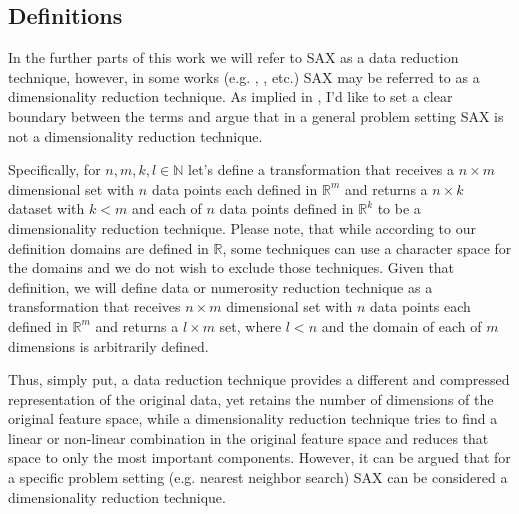 \documentclass{article}
\begin{document}
\subsection{Definitions}
In the further parts of this work we will refer to SAX as a data reduction technique, however, in some works (e.g. \cite{keogh2001dimensionality}, \cite{lin2007experiencing}, \cite{shieh2008sax} etc.) SAX may be referred to as a dimensionality reduction technique. As implied in \cite{xi2006fast}, I'd like to set a clear boundary between the terms and argue that in a general problem setting SAX is not a dimensionality reduction technique. \par
Specifically, for $n,m,k,l \in \mathbb{N}$ let's define a transformation that receives a $n \times m$ dimensional set with $n$ data points each defined in $\mathbb{R}^m$ and returns a $n \times k$ dataset with $k < m$ and each of $n$ data points defined in $\mathbb{R}^k$ to be a dimensionality reduction technique. Please note, that while according to our definition domains are defined in $\mathbb{R}$, some techniques can use a character space for the domains and we do not wish to exclude those techniques. Given that definition, we will define data or numerosity reduction technique as a transformation that receives $n \times m$ dimensional set with $n$ data points each defined in $\mathbb{R}^m$ and returns a $l \times m$ set, where $l < n$ and the domain of each of $m$ dimensions is arbitrarily defined. \par
Thus, simply put, a data reduction technique provides a different and compressed representation of the original data, yet retains the number of dimensions of the original feature space, while a dimensionality reduction technique tries to find a linear or non-linear combination in the original feature space and reduces that space to only the most important components. However, it can be argued that for a specific problem setting (e.g. nearest neighbor search) SAX can be considered a dimensionality reduction technique.
\end{document}
